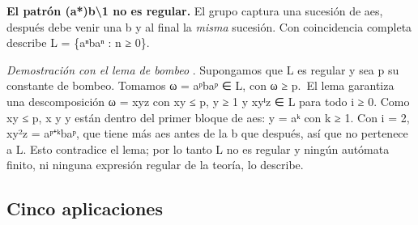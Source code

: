 \textbf{El patrón (a*)b\textbackslash1 no es regular.} El grupo captura una sucesión de aes, después debe venir una b y al final la \emph{misma} sucesión. Con coincidencia completa describe L = \{aⁿbaⁿ : n ≥ 0\}.

\emph{Demostración con el lema de bombeo} \autocite[sec.~4.1]{hopcroft2007}. Supongamos que L es regular y sea p su constante de bombeo. Tomamos ω = aᵖbaᵖ ∈ L, con \textbar ω\textbar{} ≥ p.~El lema garantiza una descomposición ω = xyz con \textbar xy\textbar{} ≤ p, \textbar y\textbar{} ≥ 1 y xyⁱz ∈ L para todo i ≥ 0. Como \textbar xy\textbar{} ≤ p, x y y están dentro del primer bloque de aes: y = aᵏ con k ≥ 1. Con i = 2, xy²z = aᵖ⁺ᵏbaᵖ, que tiene más aes antes de la b que después, así que no pertenece a L. Esto contradice el lema; por lo tanto L no es regular y ningún autómata finito, ni ninguna expresión regular de la teoría, lo describe.

\hypertarget{cinco-aplicaciones}{%
\subsection{Cinco aplicaciones}\label{cinco-aplicaciones}}

